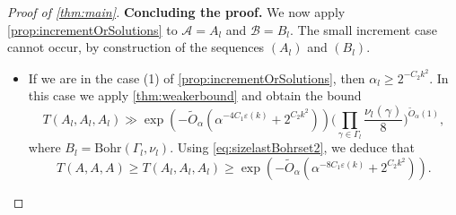 \documentclass{daj}
\theoremstyle{definition}
\newcommand{\eps}{\varepsilon}
\newcommand{\A}{\ensuremath{\mathcal{A}}}
\newcommand{\B}{\ensuremath{\mathcal{B}}}
\begin{document}
\begin{proof}[Proof of \cref{thm:main}]
\medbreak\textbf{Concluding the proof.}
We now apply \cref{prop:incrementOrSolutions} to $\A = A_l$ and $\B = B_l$. The small increment case cannot occur, by construction of the sequences $(A_l)$ and $(B_l)$.
\begin{itemize}
	\item If we are in the case (1) of \cref{prop:incrementOrSolutions}, then $\alpha_l \geq 2^{-C_2k^2}$. In this case we apply \cref{thm:weakerbound} and obtain the bound
	\begin{equation*}
	T(A_l, A_l, A_l) \gg \exp \left(-\tilde{O}_{\alpha}\left(\alpha^{-4C_1\eps(k)}+ 2^{C_2k^2}\right) \right) \bigg( \prod_{\gamma\in \Gamma_l} \frac{\nu_l(\gamma)}{8}\bigg)^{\tilde{O}_{\alpha}(1)},
	\end{equation*}
	where $B_l = \mathrm{Bohr}(\Gamma_l, \nu_l)$. Using \cref{eq:sizelastBohrset2}, we deduce that
	\begin{equation*}
	T(A, A, A) \geq T(A_l, A_l, A_l) \geq \exp \left( - \tilde{O}_{\alpha}\left(\alpha^{-8C_1\eps(k)}+ 2^{C_2k^2}\right) \right).
	\end{equation*}
	

\end{itemize}
\end{proof}
\end{document}
